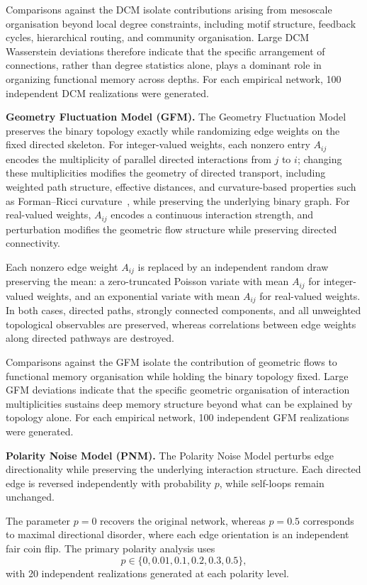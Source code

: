 \documentclass[aps,superscriptaddress,11pt]{revtex4-2}
\theoremstyle{definition}
\theoremstyle{plain}
\begin{document}
Comparisons against the DCM isolate contributions arising from mesoscale
organisation beyond local degree constraints, including motif structure,
feedback cycles, hierarchical routing, and community organisation. Large
DCM Wasserstein deviations therefore indicate that the specific arrangement
of connections, rather than degree statistics alone, plays a dominant role
in organizing functional memory across depths. For each empirical network,
100 independent DCM realizations were generated.

\medskip
\noindent\textbf{Geometry Fluctuation Model (GFM).}
The Geometry Fluctuation Model preserves the binary topology exactly while
randomizing edge weights on the fixed directed skeleton. For
integer-valued weights, each nonzero entry $A_{ij}$ encodes the
multiplicity of parallel directed interactions from $j$ to $i$; changing
these multiplicities modifies the geometry of directed transport, including
weighted path structure, effective distances, and curvature-based
properties such as Forman--Ricci curvature~\cite{Forman2003,Weber2017},
while preserving the underlying binary graph. For real-valued weights,
$A_{ij}$ encodes a continuous interaction strength, and perturbation
modifies the geometric flow structure while preserving directed connectivity.

Each nonzero edge weight $A_{ij}$ is replaced by an independent random
draw preserving the mean: a zero-truncated Poisson variate with mean
$A_{ij}$ for integer-valued weights, and an exponential variate with mean
$A_{ij}$ for real-valued weights. In both cases, directed paths, strongly
connected components, and all unweighted topological observables are
preserved, whereas correlations between edge weights along directed
pathways are destroyed.

Comparisons against the GFM isolate the contribution of geometric flows to functional memory 
organisation while holding the binary
topology fixed. Large GFM deviations indicate that the specific geometric
organisation of interaction multiplicities sustains deep memory structure
beyond what can be explained by topology alone. For each empirical
network, 100 independent GFM realizations were generated.

\medskip
\noindent\textbf{Polarity Noise Model (PNM).}
The Polarity Noise Model perturbs edge directionality while preserving the
underlying interaction structure. Each directed edge is reversed
independently with probability $p$, while self-loops remain unchanged.

The parameter $p=0$ recovers the original network, whereas $p=0.5$
corresponds to maximal directional disorder, where each edge orientation is
an independent fair coin flip. The primary polarity analysis uses
\[
p\in\{0,0.01,0.1,0.2,0.3,0.5\},
\]
with 20 independent realizations generated at each polarity level.
\end{document}

